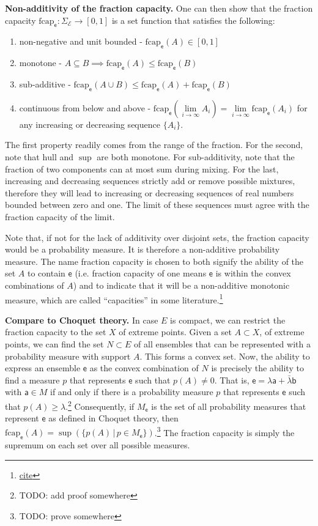 \documentclass[10pt,twocolumn, nofootinbib]{revtex4-2}
\newcommand\hull{\mathrm{hull}}
\newcommand\frcap{\mathrm{fcap}}
\newcommand{\ens}[1][e] {\mathsf{#1}} %
\newcommand{\Ens}[1][E] {\mathcal{#1}} %
\begin{document}
\textbf{Non-additivity of the fraction capacity.} One can then show that the fraction capacity $\frcap_{\ens} : \Sigma_{\Ens} \to [0,1]$ is a set function that satisfies the following:
\begin{enumerate}
	\item non-negative and unit bounded - $\frcap_{\ens}(A) \in [0,1]$
	\item monotone - $A \subseteq B \implies \frcap_{\ens}(A) \leq \frcap_{\ens}(B)$
	\item sub-additive - $\frcap_{\ens}(A \cup B) \leq \frcap_{\ens}(A) + \frcap_{\ens}(B)$
	\item continuous from below and above - $\frcap_{\ens}(\lim\limits_{i \to \infty} A_i) = \lim\limits_{i \to \infty} \frcap_{\ens}(A_i)$ for any increasing or decreasing sequence $\{A_i\}$.
\end{enumerate}

The first property readily comes from the range of the fraction. For the second, note that $\hull$ and $\sup$ are both monotone. For sub-additivity, note that the fraction of two components can at most sum during mixing. For the last, increasing and decreasing sequences strictly add or remove possible mixtures, therefore they will lead to increasing or decreasing sequences of real numbers bounded between zero and one. The limit of these sequences must agree with the fraction capacity of the limit.

Note that, if not for the lack of additivity over disjoint sets, the fraction capacity would be a probability measure. It is therefore a non-additive probability measure. The name fraction capacity is chosen to both signify the ability of the set $A$ to contain $\ens$ (i.e. fraction capacity of one means $\ens$ is within the convex combinations of $A$) and to indicate that it will be a non-additive monotonic measure, which are called ``capacities'' in some literature.\footnote{ \href{ https://link.springer.com/book/10.1007/978-3-319-03155-2}{cite} }

\textbf{Compare to Choquet theory.} In case $E$ is compact, we can restrict the fraction capacity to the set $X$ of extreme points. Given a set $A \subset X$, of extreme points, we can find the set $N \subset E$ of all ensembles that can be represented with a probability measure with support $A$. This forms a convex set. Now, the ability to express an ensemble $\ens$ as the convex combination of $N$ is precisely the ability to find a measure $p$ that represents $\ens$ such that $p(A) \neq 0$. That is, $\ens = \lambda \ens[a] + \bar{\lambda} \ens[b]$ with $\ens[a] \in M$ if and only if there is a probability measure $p$ that represents $\ens$ such that $p(A) \geq \lambda$.\footnote{TODO: add proof somewhere} Consequently, if $M_{\ens}$ is the set of all probability measures that represent $\ens$ as defined in Choquet theory, then $\frcap_{\ens}(A) = \sup(\{p(A) \, | \, p \in M_{\ens}\})$.\footnote{TODO: prove somewhere} The fraction capacity is simply the supremum on each set over all possible measures.
\end{document}
